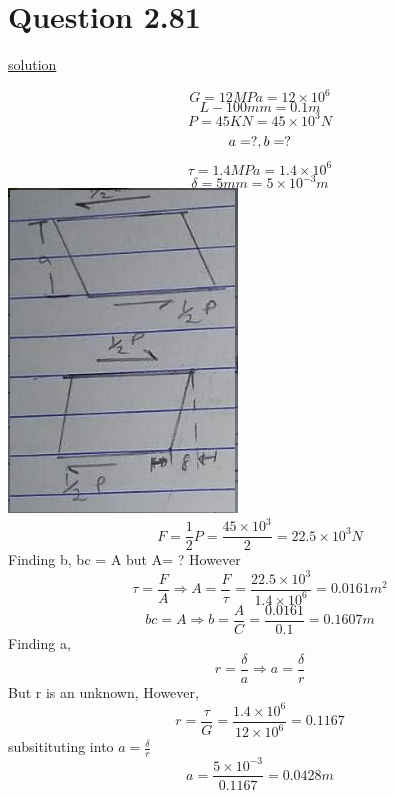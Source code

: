 \documentclass{article}
\begin{document}
\section*{Question 2.81}
\begin{center}\underline{solution}\end{center}
\[G = 12MPa = 12\times10^{6}\]
\[L - 100mm = 0.1m\]
\[P = 45KN = 45\times10^{3}N\]
\[a = ?, \space b=?\]
\[\tau = 1.4MPa = 1.4\times10^{6}\]
\[\delta = 5mm = 5\times10^{-3}m\]
\includegraphics{IMG-20220128-WA0012}
\[F = \frac{1}{2}P = \frac{45\times10^{3}}{2} = 22.5\times10^{3}N\]
Finding b, bc = A but A= ? However\[\tau = \frac{F}{A} \Rightarrow A= \frac{F}{\tau} = \frac{22.5\times10^{3}}{1.4\times10^{6}} = 0.0161m^{2}\]
\[bc=A \Rightarrow b= \frac{A}{C}=\frac{0.0161}{0.1} = 0.1607m\]
Finding a, \[r = \frac{\delta}{a} \Rightarrow a = \frac{\delta}{r}\]
But r is an unknown, However,\[r = \frac{\tau}{G} = \frac{1.4\times10^{6}}{12\times10^{6}}=0.1167\]
subsitituting into $a=\frac{\delta}{r}$
\[a = \frac{5\times10^{-3}}{0.1167} = 0.0428m\]
\end{document}
